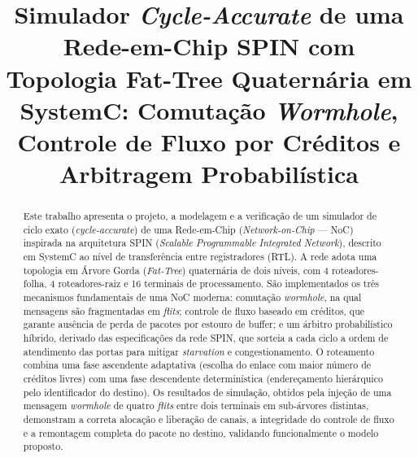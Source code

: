 \documentclass[conference]{IEEEtran}
\begin{document}
\title{Simulador \emph{Cycle-Accurate} de uma Rede-em-Chip SPIN com Topologia
Fat-Tree Quaternária em SystemC: Comutação \emph{Wormhole}, Controle de Fluxo
por Créditos e Arbitragem Probabilística}

\author{
}

\maketitle

\begin{abstract}
Este trabalho apresenta o projeto, a modelagem e a verificação de um simulador
de ciclo exato (\emph{cycle-accurate}) de uma Rede-em-Chip (\emph{Network-on-Chip}
--- NoC) inspirada na arquitetura SPIN (\emph{Scalable Programmable Integrated
Network}), descrito em SystemC ao nível de transferência entre registradores
(RTL). A rede adota uma topologia em Árvore Gorda (\emph{Fat-Tree}) quaternária
de dois níveis, com 4 roteadores-folha, 4 roteadores-raiz e 16 terminais de
processamento. São implementados os três mecanismos fundamentais de uma NoC
moderna: comutação \emph{wormhole}, na qual mensagens são fragmentadas em
\emph{flits}; controle de fluxo baseado em créditos, que garante ausência de
perda de pacotes por estouro de buffer; e um árbitro probabilístico híbrido,
derivado das especificações da rede SPIN, que sorteia a cada ciclo a ordem de
atendimento das portas para mitigar \emph{starvation} e congestionamento. O
roteamento combina uma fase ascendente adaptativa (escolha do enlace com maior
número de créditos livres) com uma fase descendente determinística (endereçamento
hierárquico pelo identificador do destino). Os resultados de simulação, obtidos
pela injeção de uma mensagem \emph{wormhole} de quatro \emph{flits} entre dois
terminais em sub-árvores distintas, demonstram a correta alocação e liberação de
canais, a integridade do controle de fluxo e a remontagem completa do pacote no
destino, validando funcionalmente o modelo proposto.
\end{abstract}
\end{document}
